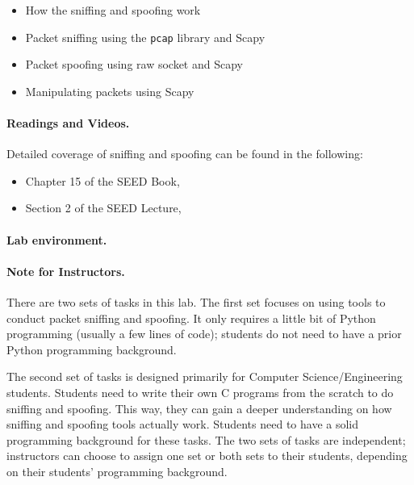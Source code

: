 \begin{itemize}[noitemsep]
\item How the sniffing and spoofing work
\item Packet sniffing using the {\tt pcap} library and Scapy
\item Packet spoofing using raw socket and Scapy
\item Manipulating packets using Scapy 
\end{itemize}



\paragraph{Readings and Videos.}
Detailed coverage of sniffing and spoofing can be found in
the following:

\begin{itemize}
\item Chapter 15 of the SEED Book, \seedbook

\item Section 2 of the SEED Lecture, \seedisvideo
\end{itemize}



\paragraph{Lab environment.} \seedenvironmentC



\paragraph{Note for Instructors.}
There are two sets of tasks in this lab. The first set focuses on using 
tools to conduct packet sniffing and spoofing. It only requires a
little bit of Python programming (usually a few lines of code); students do
not need to have a prior Python programming background. 

The second set of tasks is designed primarily for Computer Science/Engineering students.
Students need to write their own C programs from the scratch to do sniffing 
and spoofing. This way, they can gain a deeper understanding 
on how sniffing and spoofing tools actually work. Students 
need to have a solid programming background for these tasks.
The two sets of tasks are independent; instructors can choose to
assign one set or both sets to their students, depending on 
their students' programming background.


